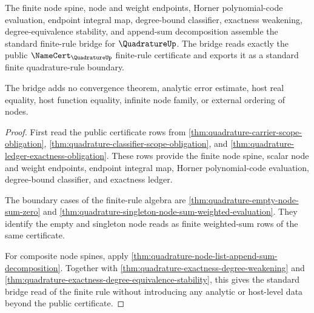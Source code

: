 \begin{theorem}
\label{thm:quadrature-external-finite-rule-bridge}
The finite node spine, node and weight endpoints, Horner polynomial-code
evaluation, endpoint integral map, degree-bound classifier, exactness
weakening, degree-equivalence stability, and append-sum decomposition assemble
the standard finite-rule bridge for $\QuadratureUp$. The bridge reads exactly
the public $\NameCert_{\QuadratureUp}$ finite-rule certificate and exports it as
a standard finite quadrature-rule boundary.

The bridge adds no convergence theorem, analytic error estimate, host real
equality, host function equality, infinite node family, or external ordering of
nodes.
\end{theorem}
\begin{proof}
First read the public certificate rows from
\autoref{thm:quadrature-carrier-scope-obligation},
\autoref{thm:quadrature-classifier-scope-obligation}, and
\autoref{thm:quadrature-ledger-exactness-obligation}. These rows provide the
finite node spine, scalar node and weight endpoints, endpoint integral map,
Horner polynomial-code evaluation, degree-bound classifier, and exactness
ledger.

The boundary cases of the finite-rule algebra are
\autoref{thm:quadrature-empty-node-sum-zero} and
\autoref{thm:quadrature-singleton-node-sum-weighted-evaluation}. They identify
the empty and singleton node reads as finite weighted-sum rows of the same
certificate.

For composite node spines, apply
\autoref{thm:quadrature-node-list-append-sum-decomposition}. Together with
\autoref{thm:quadrature-exactness-degree-weakening} and
\autoref{thm:quadrature-exactness-degree-equivalence-stability}, this gives the
standard bridge read of the finite rule without introducing any analytic or
host-level data beyond the public certificate.
\end{proof}
